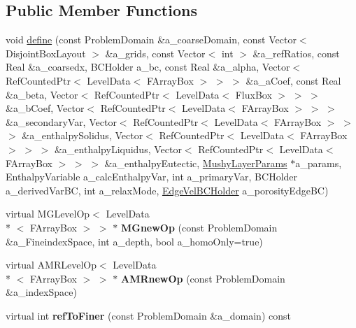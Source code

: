 \subsection*{Public Member Functions}
\begin{DoxyCompactItemize}
\item 
void \hyperlink{class_a_m_r_liquid_conc_op_factory_a15c6b0b665b015266c8a8c9ef45c0c49}{define} (const Problem\-Domain \&a\-\_\-coarse\-Domain, const Vector$<$ Disjoint\-Box\-Layout $>$ \&a\-\_\-grids, const Vector$<$ int $>$ \&a\-\_\-ref\-Ratios, const Real \&a\-\_\-coarsedx, B\-C\-Holder a\-\_\-bc, const Real \&a\-\_\-alpha, Vector$<$ Ref\-Counted\-Ptr$<$ Level\-Data$<$ F\-Array\-Box $>$ $>$ $>$ \&a\-\_\-a\-Coef, const Real \&a\-\_\-beta, Vector$<$ Ref\-Counted\-Ptr$<$ Level\-Data$<$ Flux\-Box $>$ $>$ $>$ \&a\-\_\-b\-Coef, Vector$<$ Ref\-Counted\-Ptr$<$ Level\-Data$<$ F\-Array\-Box $>$ $>$ $>$ \&a\-\_\-secondary\-Var, Vector$<$ Ref\-Counted\-Ptr$<$ Level\-Data$<$ F\-Array\-Box $>$ $>$ $>$ \&a\-\_\-enthalpy\-Solidus, Vector$<$ Ref\-Counted\-Ptr$<$ Level\-Data$<$ F\-Array\-Box $>$ $>$ $>$ \&a\-\_\-enthalpy\-Liquidus, Vector$<$ Ref\-Counted\-Ptr$<$ Level\-Data$<$ F\-Array\-Box $>$ $>$ $>$ \&a\-\_\-enthalpy\-Eutectic, \hyperlink{class_mushy_layer_params}{Mushy\-Layer\-Params} $\ast$a\-\_\-params, Enthalpy\-Variable a\-\_\-calc\-Enthalpy\-Var, int a\-\_\-primary\-Var, B\-C\-Holder a\-\_\-derived\-Var\-B\-C, int a\-\_\-relax\-Mode, \hyperlink{class_edge_vel_b_c_holder}{Edge\-Vel\-B\-C\-Holder} a\-\_\-porosity\-Edge\-B\-C)
\item 
\hypertarget{class_a_m_r_liquid_conc_op_factory_aa40368a95f9cb6a48fc5ff9d210d63c9}{virtual M\-G\-Level\-Op$<$ Level\-Data\\*
$<$ F\-Array\-Box $>$ $>$ $\ast$ {\bfseries M\-Gnew\-Op} (const Problem\-Domain \&a\-\_\-\-Fineindex\-Space, int a\-\_\-depth, bool a\-\_\-homo\-Only=true)}\label{class_a_m_r_liquid_conc_op_factory_aa40368a95f9cb6a48fc5ff9d210d63c9}

\item 
\hypertarget{class_a_m_r_liquid_conc_op_factory_a140f6325a11c89ebb1775e16fb65ab51}{virtual A\-M\-R\-Level\-Op$<$ Level\-Data\\*
$<$ F\-Array\-Box $>$ $>$ $\ast$ {\bfseries A\-M\-Rnew\-Op} (const Problem\-Domain \&a\-\_\-index\-Space)}\label{class_a_m_r_liquid_conc_op_factory_a140f6325a11c89ebb1775e16fb65ab51}

\item 
\hypertarget{class_a_m_r_liquid_conc_op_factory_a5e29bf33525ea7dc4f6f1620ded58669}{virtual int {\bfseries ref\-To\-Finer} (const Problem\-Domain \&a\-\_\-domain) const }\label{class_a_m_r_liquid_conc_op_factory_a5e29bf33525ea7dc4f6f1620ded58669}

\end{DoxyCompactItemize}
